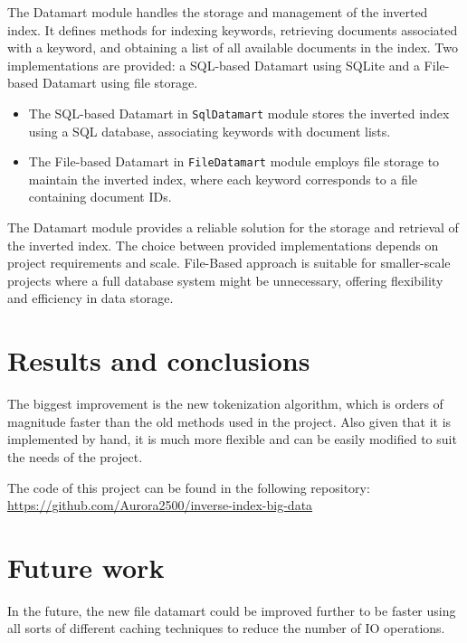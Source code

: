 \documentclass{article}
\begin{document}
The Datamart module handles the storage and management of the inverted index. It defines methods for indexing keywords, retrieving documents associated with a keyword, and obtaining a list of all available documents in the index. Two implementations are provided: a SQL-based Datamart using SQLite and a File-based Datamart using file storage.
\begin{itemize}

\item 
The SQL-based Datamart in \texttt{SqlDatamart} module stores the inverted index using a SQL database, associating keywords with document lists.

\item 
The File-based Datamart in \texttt{FileDatamart} module employs file storage to maintain the inverted index, where each keyword corresponds to a file containing document IDs. 
\end{itemize}
The Datamart module provides a reliable solution for the storage and retrieval of the inverted index. The choice between provided implementations depends on project requirements and scale.
File-Based approach is suitable for smaller-scale projects where a full database system might be unnecessary, offering flexibility and efficiency in data storage.

\section{Results and conclusions}

The biggest improvement is the new tokenization algorithm, which is orders of magnitude faster than the old methods used in the project.
Also given that it is implemented by hand, it is much more flexible and can be easily modified to suit the needs of the project.

The code of this project can be found in the following repository: \url{https://github.com/Aurora2500/inverse-index-big-data}

\section{Future work}

In the future, the new file datamart could be improved further to be faster using all sorts of different caching techniques to reduce the number of IO operations.
\end{document}
